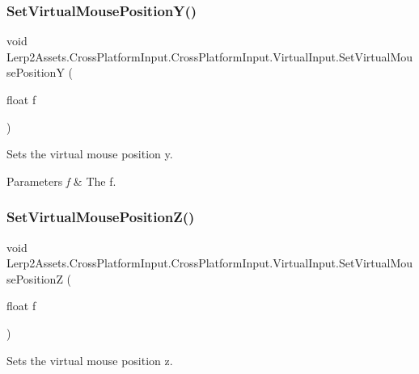 \subsubsection{\texorpdfstring{Set\+Virtual\+Mouse\+Position\+Y()}{SetVirtualMousePositionY()}}
{\footnotesize\ttfamily void Lerp2\+Assets.\+Cross\+Platform\+Input.\+Cross\+Platform\+Input.\+Virtual\+Input.\+Set\+Virtual\+Mouse\+PositionY (\begin{DoxyParamCaption}\item[{float}]{f }\end{DoxyParamCaption})\hspace{0.3cm}{\ttfamily [inline]}}



Sets the virtual mouse position y. 


\begin{DoxyParams}{Parameters}
{\em f} & The f.\\
\hline
\end{DoxyParams}
\mbox{\label{class_lerp2_assets_1_1_cross_platform_input_1_1_cross_platform_input_1_1_virtual_input_a321ecd4148cdd8d82b1f0fc0b9e437c6}} 
\subsubsection{\texorpdfstring{Set\+Virtual\+Mouse\+Position\+Z()}{SetVirtualMousePositionZ()}}
{\footnotesize\ttfamily void Lerp2\+Assets.\+Cross\+Platform\+Input.\+Cross\+Platform\+Input.\+Virtual\+Input.\+Set\+Virtual\+Mouse\+PositionZ (\begin{DoxyParamCaption}\item[{float}]{f }\end{DoxyParamCaption})\hspace{0.3cm}{\ttfamily [inline]}}



Sets the virtual mouse position z. 


